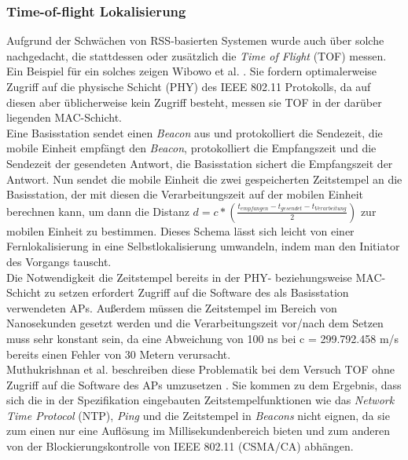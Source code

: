 \subsubsection{Time-of-flight Lokalisierung}
\label{ch:Vorherige:sec:TOF}
Aufgrund der Schwächen von RSS-basierten Systemen wurde auch über solche nachgedacht, die stattdessen oder zusätzlich die \emph{Time of Flight} (TOF) messen. 
Ein Beispiel für ein solches zeigen Wibowo et al. \cite{wibowo2009time}. 
Sie fordern optimalerweise Zugriff auf die physische Schicht (PHY) des IEEE 802.11 Protokolls, da auf diesen aber üblicherweise kein Zugriff besteht, messen sie TOF in der darüber liegenden MAC-Schicht.\\
Eine Basisstation sendet einen \emph{Beacon} aus und protokolliert die Sendezeit, die mobile Einheit empfängt den \emph{Beacon}, protokolliert die Empfangszeit und die Sendezeit der gesendeten Antwort, die Basisstation sichert die Empfangszeit der Antwort.
Nun sendet die mobile Einheit die zwei gespeicherten Zeitstempel an die Basisstation, der mit diesen die Verarbeitungszeit auf der mobilen Einheit berechnen kann, um dann die Distanz $d = c * (\frac{t_{empfangen} - t_{gesendet} - t_{Verarbeitung}}{2})$ zur mobilen Einheit zu bestimmen.
Dieses Schema lässt sich leicht von einer Fernlokalisierung in eine Selbstlokalisierung umwandeln, indem man den Initiator des Vorgangs tauscht.\\
Die Notwendigkeit die Zeitstempel bereits in der PHY- beziehungsweise MAC-Schicht zu setzen erfordert Zugriff auf die Software des als Basisstation verwendeten APs. 
Außerdem müssen die Zeitstempel im Bereich von Nanosekunden gesetzt werden und die Verarbeitungszeit vor/nach dem Setzen muss sehr konstant sein, da eine Abweichung von 100 ns bei c = 299.792.458 m/s bereits einen Fehler von 30 Metern verursacht.\\
Muthukrishnan et al. beschreiben diese Problematik bei dem Versuch TOF ohne Zugriff auf die Software des APs umzusetzen \cite{muthukrishnan2006using}.
Sie kommen zu dem Ergebnis, dass sich die in der Spezifikation eingebauten Zeitstempelfunktionen wie das \emph{Network Time Protocol} (NTP), \emph{Ping} und die Zeitstempel in \emph{Beacons} nicht eignen, da sie zum einen nur eine Auflösung im Millisekundenbereich bieten und zum anderen von der Blockierungskontrolle von IEEE 802.11 (CSMA/CA) abhängen.

